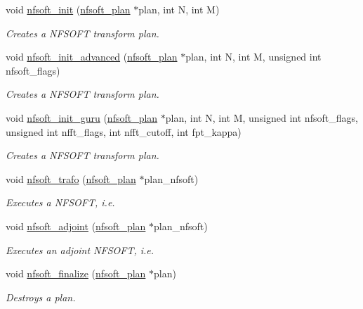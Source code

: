 \begin{CompactItemize}
\item 
void \hyperlink{group__nfsoft_g31c884458165fa204073c6c16c10775e}{nfsoft\_\-init} (\hyperlink{structnfsoft__plan}{nfsoft\_\-plan} $\ast$plan, int N, int M)
\begin{CompactList}\small\item\em Creates a NFSOFT transform plan. \item\end{CompactList}\item 
void \hyperlink{group__nfsoft_gf4aec4ee2a2a5d56ca27c4f1a7f90b18}{nfsoft\_\-init\_\-advanced} (\hyperlink{structnfsoft__plan}{nfsoft\_\-plan} $\ast$plan, int N, int M, unsigned int nfsoft\_\-flags)
\begin{CompactList}\small\item\em Creates a NFSOFT transform plan. \item\end{CompactList}\item 
void \hyperlink{group__nfsoft_g1c13cdd3f82f48fa41acdd313cdc2052}{nfsoft\_\-init\_\-guru} (\hyperlink{structnfsoft__plan}{nfsoft\_\-plan} $\ast$plan, int N, int M, unsigned int nfsoft\_\-flags, unsigned int nfft\_\-flags, int nfft\_\-cutoff, int fpt\_\-kappa)
\begin{CompactList}\small\item\em Creates a NFSOFT transform plan. \item\end{CompactList}\item 
void \hyperlink{group__nfsoft_ge243cd75d7571a99eae53818e32355fb}{nfsoft\_\-trafo} (\hyperlink{structnfsoft__plan}{nfsoft\_\-plan} $\ast$plan\_\-nfsoft)
\begin{CompactList}\small\item\em Executes a NFSOFT, i.e. \item\end{CompactList}\item 
void \hyperlink{group__nfsoft_g08395b1dd90f9a2565685d17460afc5b}{nfsoft\_\-adjoint} (\hyperlink{structnfsoft__plan}{nfsoft\_\-plan} $\ast$plan\_\-nfsoft)
\begin{CompactList}\small\item\em Executes an adjoint NFSOFT, i.e. \item\end{CompactList}\item 
void \hyperlink{group__nfsoft_g30b5c6ae1ff496680f11ddcaad2d5a47}{nfsoft\_\-finalize} (\hyperlink{structnfsoft__plan}{nfsoft\_\-plan} $\ast$plan)
\begin{CompactList}\small\item\em Destroys a plan. \item\end{CompactList}\end{CompactItemize}



